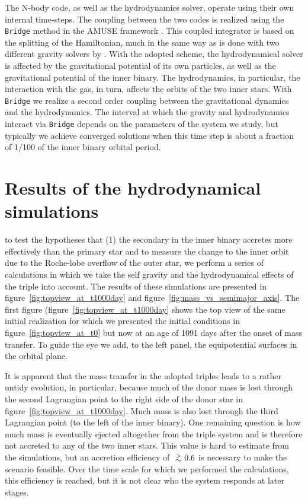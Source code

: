 \documentclass{aastex62}
\def\apgt{\ {\raise-.5ex\hbox{$\buildrel>\over\sim$}}\ }
\begin{document}
The N-body code, as well as the hydrodynamics solver, operate using
their own internal time-steps. The coupling between the two codes is
realized using the \texttt{Bridge} method in the AMUSE framework
\citep[see Sect.\.4.3.1 in][]{2013CoPhC.183..456P}.  This coupled
integrator is based on the splitting of the Hamiltonian, much in the
same way as is done with two different gravity solvers by
\cite{2007PASJ...59.1095F}. With the adopted scheme, the
hydrodynamical solver is affected by the gravitational potential of
its own particles, as well as the gravitational potential of the inner
binary. The hydrodynamics, in particular, the interaction with the gas,
in turn, affects the orbits of the two inner stars. With
\texttt{Bridge} we realize a second order coupling between the
gravitational dynamics and the hydrodynamics.  The interval at which
the gravity and hydrodynamics interact via \texttt{Bridge} depends on
the parameters of the system we study, but typically we achieve
converged solutions when this time step is about a fraction of 1/100
of the inner binary orbital period.

\section{Results of the hydrodynamical simulations} \label{results}

to test the hypotheses that (1) the secondary in the inner binary
accretes more effectively than the primary star and to measure the
change to the inner orbit due to the Roche-lobe overflow of the outer
star, we perform a series of calculations in which we take the self
gravity and the hydrodynamical effects of the triple into account.
The results of these simulations are presented in
figure~\ref{fig:topview_at_t1000day} and
figure~\ref{fig:mass_vs_semimajor_axis}.  The first figure
(figure~\ref{fig:topview_at_t1000day} shows the top view of the same
initial realization for which we presented the initial conditions in
figure~\ref{fig:topview_at_t0} but now at an age of 1091 days after
the onset of mass transfer. To guide the eye we add, to the left panel,
the equipotential surfaces in the orbital plane.

It is apparent that the mass transfer in the adopted triples leads to
a rather untidy evolution, in particular, because much of the donor
mass is lost through the second Lagrangian point to the right side of
the donor star in figure~\ref{fig:topview_at_t1000day}. Much mass is
also lost through the third Lagrangian point (to the left of the inner
binary). One remaining question is how much mass is eventually ejected
altogether from the triple system and is therefore not accreted to any
of the two inner stars. This value is hard to estimate from the
simulations, but an accretion efficiency of $\apgt 0.6$ is necessary to
make the scenario feasible. Over the time scale for which we performed
the calculations, this efficiency is reached, but it is not clear who
the system responds at later stages.
\end{document}
